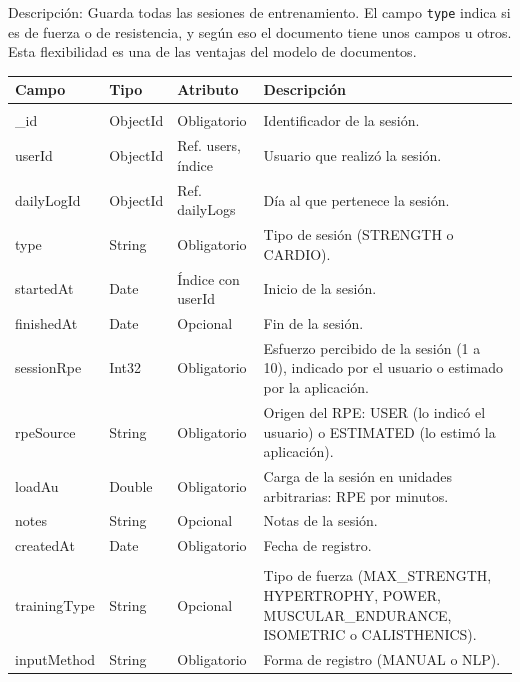 Descripción: Guarda todas las sesiones de entrenamiento. El campo \texttt{type} indica si es de fuerza o de resistencia, y según eso el documento tiene unos campos u otros. Esta flexibilidad es una de las ventajas del modelo de documentos.
{\footnotesize
\renewcommand{\arraystretch}{1.2}
\begin{longtable}{|>{\raggedright\arraybackslash}p{4.7cm}|>{\raggedright\arraybackslash}p{1.8cm}|>{\raggedright\arraybackslash}p{2.3cm}|>{\raggedright\arraybackslash}p{5.4cm}|}
    \hline
    \rowcolor[HTML]{EFEFEF}
    \textbf{Campo} & \textbf{Tipo} & \textbf{Atributo} & \textbf{Descripción} \\ \hline
    \endhead
    \multicolumn{4}{|l|}{\cellcolor[HTML]{E3F2FD}\textbf{Campos comunes}} \\ \hline
    \_id & ObjectId & Obligatorio & Identificador de la sesión. \\ \hline
    userId & ObjectId & Ref. users, índice & Usuario que realizó la sesión. \\ \hline
    dailyLogId & ObjectId & Ref. dailyLogs & Día al que pertenece la sesión. \\ \hline
    type & String & Obligatorio & Tipo de sesión (STRENGTH o CARDIO). \\ \hline
    startedAt & Date & Índice con userId & Inicio de la sesión. \\ \hline
    finishedAt & Date & Opcional & Fin de la sesión. \\ \hline
    sessionRpe & Int32 & Obligatorio & Esfuerzo percibido de la sesión (1 a 10), indicado por el usuario o estimado por la aplicación. \\ \hline
    rpeSource & String & Obligatorio & Origen del RPE: USER (lo indicó el usuario) o ESTIMATED (lo estimó la aplicación). \\ \hline
    loadAu & Double & Obligatorio & Carga de la sesión en unidades arbitrarias: RPE por minutos. \\ \hline
    notes & String & Opcional & Notas de la sesión. \\ \hline
    createdAt & Date & Obligatorio & Fecha de registro. \\ \hline
    \multicolumn{4}{|l|}{\cellcolor[HTML]{E3F2FD}\textbf{Solo cuando type = STRENGTH}} \\ \hline
    trainingType & String & Opcional & Tipo de fuerza (MAX\_STRENGTH, HYPERTROPHY, POWER, MUSCULAR\_ENDURANCE, ISOMETRIC o CALISTHENICS). \\ \hline
    inputMethod & String & Obligatorio & Forma de registro (MANUAL o NLP). \\ \hline

\end{longtable}}
